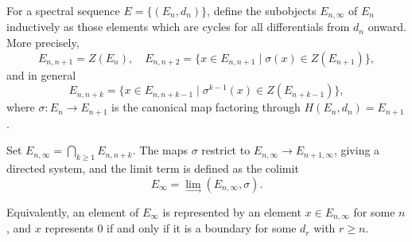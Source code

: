 For a spectral sequence $E = \{(E_n, d_n)\}$, define the subobjects $E_{n, \infty}$ of $E_n$ inductively as those elements which are cycles for all differentials from $d_n$ onward. More precisely,
$$E_{n,n+1} = Z(E_n), \quad E_{n,n+2} = \{x \in E_{n,n+1} \mid \sigma(x) \in Z(E_{n+1})\},$$
and in general
$$E_{n,n+k} = \{x \in E_{n,n+k-1} \mid \sigma^{k-1}(x) \in Z(E_{n+k-1})\},$$
where $\sigma : E_n \to E_{n+1}$ is the canonical map factoring through $H(E_n, d_n) = E_{n+1}$.

Set $E_{n,\infty} = \bigcap_{k \geq 1} E_{n,n+k}$. The maps $\sigma$ restrict to $E_{n,\infty} \to E_{n+1,\infty}$, giving a directed system, and the limit term is defined as the colimit
$$E_\infty = \lim_{\longrightarrow} (E_{n,\infty}, \sigma).$$

Equivalently, an element of $E_\infty$ is represented by an element $x \in E_{n,\infty}$ for some $n$, and $x$ represents $0$ if and only if it is a boundary for some $d_r$ with $r \geq n$.
